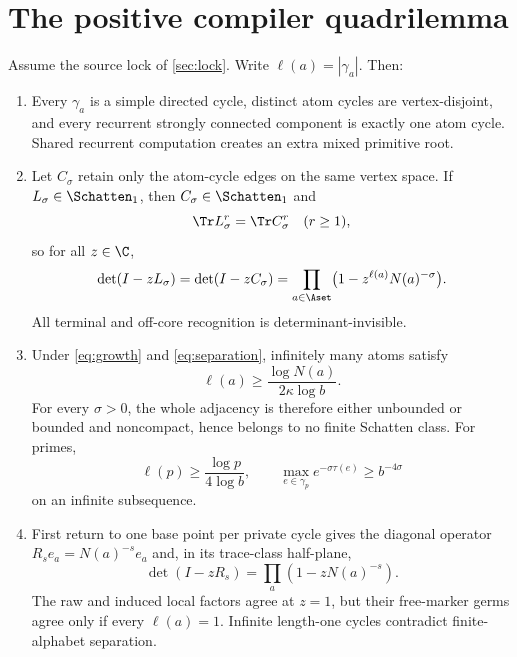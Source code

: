 \section{The positive compiler quadrilemma}

\begin{theorem}\label{thm:main}
Assume the source lock of \cref{sec:lock}.  Write
$\ell(a)=|\gamma_a|$.  Then:
\begin{enumerate}[label=\textup{(\Roman*)}]
\item Every $\gamma_a$ is a simple directed cycle, distinct atom cycles are
vertex-disjoint, and every recurrent strongly connected component is exactly
one atom cycle.  Shared recurrent computation creates an extra mixed
primitive root.
\item Let $C_\sigma$ retain only the atom-cycle edges on the same vertex
space.  If $L_\sigma\in\Schatten_1$, then $C_\sigma\in\Schatten_1$ and
\begin{equation}\label{eq:trace-equality}
\Tr L_\sigma^r=\Tr C_\sigma^r\quad(r\ge1),
\end{equation}
so for all $z\in\C$,
\begin{equation}\label{eq:rawdet}
\det(I-zL_\sigma)=\det(I-zC_\sigma)
=\prod_{a\in\Aset}\bigl(1-z^{\ell(a)}N(a)^{-\sigma}\bigr).
\end{equation}
All terminal and off-core recognition is determinant-invisible.
\item Under \eqref{eq:growth} and \eqref{eq:separation}, infinitely many
atoms satisfy
\begin{equation}\label{eq:length}
\ell(a)\ge \frac{\log N(a)}{2\kappa\log b}.
\end{equation}
For every $\sigma>0$, the whole adjacency is therefore either unbounded or
bounded and noncompact, hence belongs to no finite Schatten class.  For
primes,
\begin{equation}\label{eq:prime-length}
\ell(p)\ge\frac{\log p}{4\log b},\qquad
\max_{e\in\gamma_p}e^{-\sigma\tau(e)}\ge b^{-4\sigma}
\end{equation}
on an infinite subsequence.
\item First return to one base point per private cycle gives the diagonal
operator $R_se_a=N(a)^{-s}e_a$ and, in its trace-class half-plane,
\begin{equation}\label{eq:induced}
\det(I-zR_s)=\prod_a(1-zN(a)^{-s}).
\end{equation}
The raw and induced local factors agree at $z=1$, but their free-marker germs
agree only if every $\ell(a)=1$.  Infinite length-one cycles contradict
finite-alphabet separation.
\end{enumerate}
\end{theorem}


